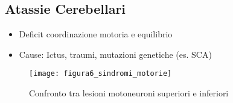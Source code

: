 \documentclass{article}
\begin{document}
\subsection{Atassie Cerebellari}
\begin{itemize}
    \item Deficit coordinazione motoria e equilibrio
    \item Cause: Ictus, traumi, mutazioni genetiche (es. SCA)
\end{itemize}

\begin{figure}[h]
    \centering
    \texttt{[image: figura6\_sindromi\_motorie]}
    \caption{Confronto tra lesioni motoneuroni superiori e inferiori}
    \label{fig:sindromi_motorie}
\end{figure}
\end{document}
